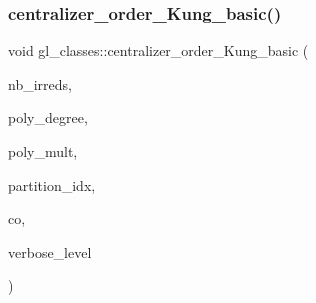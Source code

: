 \mbox{\label{classgl__classes_a625ca1143051b1dc6dea03a858b6d943}} 
\subsubsection{\texorpdfstring{centralizer\+\_\+order\+\_\+\+Kung\+\_\+basic()}{centralizer\_order\_Kung\_basic()}}
{\footnotesize\ttfamily void gl\+\_\+classes\+::centralizer\+\_\+order\+\_\+\+Kung\+\_\+basic (\begin{DoxyParamCaption}\item[{\mbox{\hyperlink{galois_8h_a09fddde158a3a20bd2dcadb609de11dc}{I\+NT}}}]{nb\+\_\+irreds,  }\item[{\mbox{\hyperlink{galois_8h_a09fddde158a3a20bd2dcadb609de11dc}{I\+NT}} $\ast$}]{poly\+\_\+degree,  }\item[{\mbox{\hyperlink{galois_8h_a09fddde158a3a20bd2dcadb609de11dc}{I\+NT}} $\ast$}]{poly\+\_\+mult,  }\item[{\mbox{\hyperlink{galois_8h_a09fddde158a3a20bd2dcadb609de11dc}{I\+NT}} $\ast$}]{partition\+\_\+idx,  }\item[{\mbox{\hyperlink{classlonginteger__object}{longinteger\+\_\+object}} \&}]{co,  }\item[{\mbox{\hyperlink{galois_8h_a09fddde158a3a20bd2dcadb609de11dc}{I\+NT}}}]{verbose\+\_\+level }\end{DoxyParamCaption})}

\mbox{\label{classgl__classes_ab325bada69ed7507d5bbb942bfe2f70c}} 
